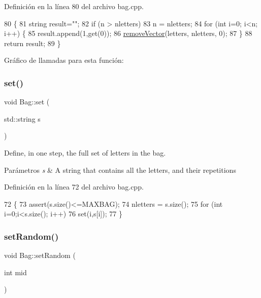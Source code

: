 Definición en la línea 80 del archivo bag.\+cpp.


\begin{DoxyCode}
80                          \{
81     \textcolor{keywordtype}{string} result=\textcolor{stringliteral}{""};
82     \textcolor{keywordflow}{if} (n > nletters)
83         n = nletters;
84     \textcolor{keywordflow}{for} (\textcolor{keywordtype}{int} i=0; i<n; i++) \{
85         result.append(1,\textcolor{keyword}{get}(0));
86         \hyperlink{bag_8cpp_a8ccee2a743b58f469047c4b4406a71e2}{removeVector}(letters, nletters, 0);
87     \}
88     \textcolor{keywordflow}{return} result;
89 \}
\end{DoxyCode}
Gráfico de llamadas para esta función\+:
\mbox{\label{classBag_a3de5aa1629a7fdd40630d140adde2757}} 
\subsubsection{\texorpdfstring{set()}{set()}}
{\footnotesize\ttfamily void Bag\+::set (\begin{DoxyParamCaption}\item[{std\+::string}]{s }\end{DoxyParamCaption})}



Define, in one step, the full set of letters in the bag. 


\begin{DoxyParams}{Parámetros}
{\em s} & A string that contains all the letters, and their repetitions \\
\hline
\end{DoxyParams}


Definición en la línea 72 del archivo bag.\+cpp.


\begin{DoxyCode}
72                          \{
73     assert(s.size()<=MAXBAG);
74     nletters = s.size();
75     \textcolor{keywordflow}{for} (\textcolor{keywordtype}{int} i=0;i<s.size(); i++)
76         \textcolor{keyword}{set}(i,s[i]);
77 \}
\end{DoxyCode}
\mbox{\label{classBag_a538b0c6342a97b45d034f41aa6a7749b}} 
\subsubsection{\texorpdfstring{set\+Random()}{setRandom()}}
{\footnotesize\ttfamily void Bag\+::set\+Random (\begin{DoxyParamCaption}\item[{int}]{mid }\end{DoxyParamCaption})}



